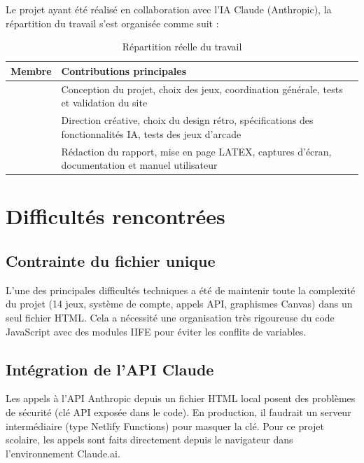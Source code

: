 \documentclass[a4paper, 12pt, twoside]{article}
\begin{document}
Le projet ayant été réalisé en collaboration avec l'IA Claude (Anthropic), la répartition du travail s'est organisée comme suit :

\begin{table}[H]
\centering
\begin{tabular}{|p{4cm}|p{9cm}|}
\hline
\textbf{Membre} & \textbf{Contributions principales} \\
\hline
[PARISOT Mathieu] & Conception du projet, choix des jeux, coordination générale, tests et validation du site \\
\hline
[CELIK Murat] & Direction créative, choix du design rétro, spécifications des fonctionnalités IA, tests des jeux d’arcade \\
\hline
[BOUTROS Antonio] & Rédaction du rapport, mise en page LATEX, captures d’écran, documentation et manuel utilisateur \\
\hline
\end{tabular}
\caption{Répartition réelle du travail}
\label{tab:repartition}
\end{table}

\newpage

\section{Difficultés rencontrées}

\subsection{Contrainte du fichier unique}

L'une des principales difficultés techniques a été de maintenir toute la complexité du projet (14 jeux, système de compte, appels API, graphismes Canvas) dans un seul fichier HTML. Cela a nécessité une organisation très rigoureuse du code JavaScript avec des modules IIFE pour éviter les conflits de variables.

\subsection{Intégration de l'API Claude}

Les appels à l'API Anthropic depuis un fichier HTML local posent des problèmes de sécurité (clé API exposée dans le code). En production, il faudrait un serveur intermédiaire (type Netlify Functions) pour masquer la clé. Pour ce projet scolaire, les appels sont faits directement depuis le navigateur dans l'environnement Claude.ai.
\end{document}
